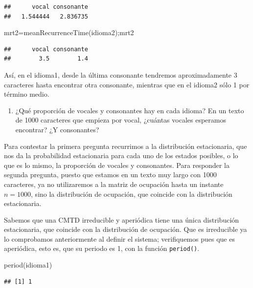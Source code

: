 \documentclass[
]{book}
\newenvironment{Shaded}{\begin{snugshade}}{\end{snugshade}}
\newcommand{\FunctionTok}[1]{\textcolor[rgb]{0.00,0.00,0.00}{#1}}
\newcommand{\NormalTok}[1]{#1}
\newcommand{\OtherTok}[1]{\textcolor[rgb]{0.56,0.35,0.01}{#1}}
\providecommand{\tightlist}{%
  \setlength{\itemsep}{0pt}\setlength{\parskip}{0pt}}
\theoremstyle{definition}
\theoremstyle{definition}
\theoremstyle{definition}
\theoremstyle{definition}
\theoremstyle{remark}
\begin{document}
\begin{verbatim}
##      vocal consonante 
##   1.544444   2.836735
\end{verbatim}

\begin{Shaded}
\begin{Highlighting}[]
\NormalTok{mrt2}\OtherTok{=}\FunctionTok{meanRecurrenceTime}\NormalTok{(idioma2);mrt2}
\end{Highlighting}
\end{Shaded}

\begin{verbatim}
##      vocal consonante 
##        3.5        1.4
\end{verbatim}

Así, en el idioma1, desde la última consonante tendremos aproximadamente 3 caracteres hasta encontrar otra consonante, mientras que en el idioma2 sólo 1 por término medio.

\begin{enumerate}
\def\labelenumi{\arabic{enumi}.}
\setcounter{enumi}{6}
\tightlist
\item
  ¿Qué proporción de vocales y consonantes hay en cada idioma? En un texto de 1000 caracteres que empieza por vocal, ¿cuántas vocales esperamos encontrar? ¿Y consonantes?
\end{enumerate}

Para contestar la primera pregunta recurrimos a la distribución estacionaria, que nos da la probabilidad estacionaria para cada uno de los estados posibles, o lo que es lo mismo, la proporción de vocales y consonantes. Para responder la segunda pregunta, puesto que estamos en un texto muy largo con 1000 caracteres, ya no utilizaremos a la matriz de ocupación hasta un instante \(n=1000\), sino la distribución de ocupación, que coincide con la distribución estacionaria.

Sabemos que una CMTD irreducible y aperiódica tiene una única distribución estacionaria, que coincide con la distribución de ocupación. Que es irreducible ya lo comprobamos anteriormente al definir el sistema; verifiquemos pues que es aperiódica, esto es, que su periodo es 1, con la función \texttt{period()}.

\begin{Shaded}
\begin{Highlighting}[]
\FunctionTok{period}\NormalTok{(idioma1)}
\end{Highlighting}
\end{Shaded}

\begin{verbatim}
## [1] 1
\end{verbatim}
\end{document}
